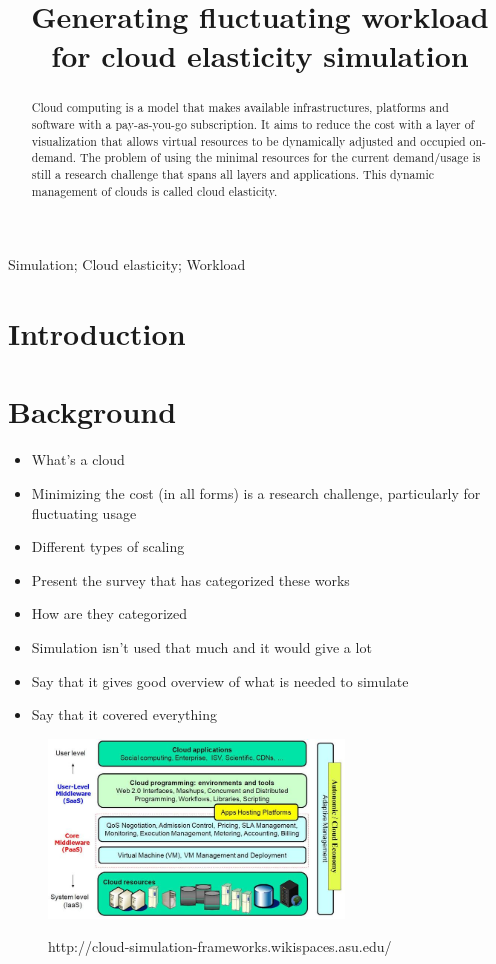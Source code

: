 \documentclass[a4paper]{IEEEtran}
\title{Generating fluctuating workload for cloud elasticity simulation}
\author{
	\IEEEauthorblockN{Simon Bihel}
	\IEEEauthorblockA{(Student) Computer Science Department, ENS Rennes\\
	\href{mailto:simon.bihel@ens-rennes.fr}{simon.bihel@ens-rennes.fr}}
}
\begin{document}
\maketitle

\begin{abstract}
  Cloud computing is a model that makes available infrastructures, platforms and
  software with a pay-as-you-go subscription. It aims to reduce the cost with a
  layer of visualization that allows virtual resources to be dynamically
  adjusted and occupied on-demand. The problem of using the minimal resources
  for the current demand/usage is still a research challenge that spans all
  layers and applications. This dynamic management of clouds is called cloud
  elasticity.
\end{abstract}

\begin{IEEEkeywords}
  Simulation;
  Cloud elasticity;
  Workload
\end{IEEEkeywords}

\section{Introduction} \label{intro}


\section{Background} \label{background}
	\begin{itemize}
		\item What's a cloud
		\item Minimizing the cost (in all forms) is a research challenge,
		particularly for fluctuating usage
		\item Different types of scaling
		\item Present the survey that has categorized these works
    \item How are they categorized
		\item Simulation isn't used that much and it would give a lot
		\item Say that it gives good overview of what is needed to simulate
		\item Say that it covered everything
	\end{itemize}
  
  \begin{figure}
    \caption{http://cloud-simulation-frameworks.wikispaces.asu.edu/}
    \centering
    \includegraphics[width=0.7\textwidth]{../plots/cloud_architecture}
    \label{cloud_arch}
  \end{figure}
  
\end{document}

